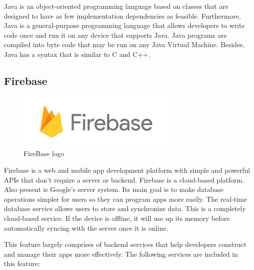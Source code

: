 Java is an object-oriented programming language based on classes that are designed to have as few implementation dependencies as feasible. Furthermore, Java is a general-purpose programming language that allows developers to write code once and run it on any device that supports Java. Java programs are compiled into byte code that may be run on any Java Virtual Machine. Besides, Java has a syntax that is similar to C and C++.

\subsection{Firebase}

\begin{figure}[H]
	\centering
	\includegraphics[width=0.7\textwidth]{img/technology/firebase.png}
	\caption{FireBase logo}
	\label{fig:FireBaseLogo}
\end{figure}

Firebase is a web and mobile app development platform with simple and powerful APIs that don't require a server or backend. Firebase is a cloud-based platform. Also present is Google's server system. Its main goal is to make database operations simpler for users so they can program apps more easily. The real-time database service allows users to store and synchronize data. This is a completely cloud-based service. If the device is offline, it will use up its memory before automatically syncing with the server once it is online.

This feature largely comprises of backend services that help developers construct and manage their apps more effectively. The following services are included in this feature:

